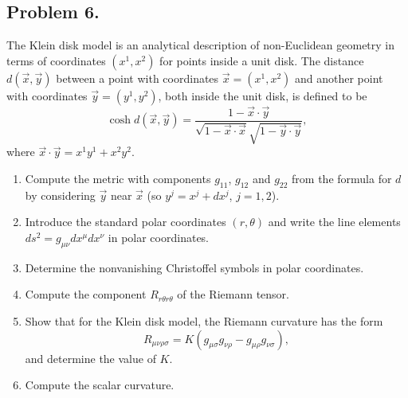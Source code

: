 \subsection*{Problem 6.}

\begin{exercise}
\label{physics:2026:6}
The Klein disk model is an analytical description of non-Euclidean geometry in terms of coordinates $(x^1,x^2)$ for points inside a unit disk. The distance $d(\vec x,\vec y)$ between a point with coordinates $\vec x=(x^1,x^2)$ and another point with coordinates $\vec y=(y^1,y^2)$, both inside the unit disk, is defined to be
\begin{equation}
    \cosh d(\vec x,\vec y)
    =
    \frac{1-\vec x\cdot\vec y}{\sqrt{1-\vec x\cdot\vec x}\sqrt{1-\vec y\cdot\vec y}}, \tag{10}
\end{equation}
where $\vec x\cdot\vec y=x^1y^1+x^2y^2$.

\begin{enumerate}
    \item Compute the metric with components $g_{11}$, $g_{12}$ and $g_{22}$ from the formula for $d$ by considering $\vec y$ near $\vec x$ (so $y^j=x^j+dx^j$, $j=1,2$).
    \item Introduce the standard polar coordinates $(r,\theta)$ and write the line elements $ds^2=g_{\mu\nu}dx^\mu dx^\nu$ in polar coordinates.
    \item Determine the nonvanishing Christoffel symbols in polar coordinates.
    \item Compute the component $R_{r\theta r\theta}$ of the Riemann tensor.
    \item Show that for the Klein disk model, the Riemann curvature has the form
    \begin{equation}
        R_{\mu\nu\rho\sigma}
        =
        K(g_{\mu\sigma}g_{\nu\rho}-g_{\mu\rho}g_{\nu\sigma}), \tag{11}
    \end{equation}
    and determine the value of $K$.
    \item Compute the scalar curvature.
\end{enumerate}
\end{exercise}

